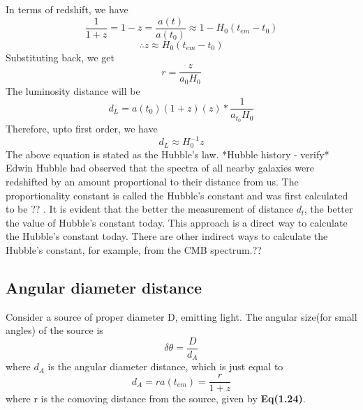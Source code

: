 \documentclass[12pt,a4paper,oneside]{book}
\begin{document}
In terms of redshift, we have
\begin{equation*}
   \frac{1}{1+z} =  1-z = \frac{a(t)}{a(t_{0})}  \approx 1 - H_{0}(t_{em}-t_{0})
\end{equation*}
\begin{equation}
    \therefore z \approx H_{0}(t_{em} - t_{0})
\end{equation}
Substituting back, we get
\begin{equation}
    r = \frac{z}{a_{0}H_{0}}
\end{equation}
The luminosity distance will be 
\begin{equation*}
    d_{L} = a(t_{0})(1+z)(z)*\frac{1}{a_{t_{0}}H_{0}} 
\end{equation*}
Therefore, upto first order, we have 
\begin{equation}
    d_{L} \approx H_{0}^{-1} z
\end{equation}
The above equation is stated as the Hubble's law. *Hubble history - verify* Edwin Hubble had observed that the spectra of all nearby galaxies were redshifted by an amount proportional to their distance from us. The proportionality constant is called the Hubble's constant and was first calculated to be ?? . It is evident that the better the measurement of distance $d_{l}$, the better the value of Hubble's constant today. This approach is a direct way to calculate the Hubble's constant today. There are other indirect ways to calculate the Hubble's constant, for example, from the CMB spectrum.??    
\subsection{Angular diameter distance}
Consider a source of proper diameter D, emitting light. The angular size(for small angles) of the source is 
\begin{equation}
    \delta \theta = \frac{D}{d_{A}}
\end{equation}
where $d_{A}$ is the angular diameter distance, which is just equal to 
\begin{equation}
    d_{A} = ra(t_{em}) = \frac{r}{1+z}
\end{equation}
where r is the comoving distance from the source, given by \textbf{Eq(1.24)}.
\end{document}
